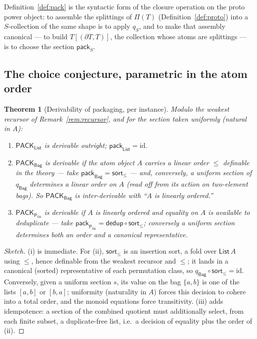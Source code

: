 \documentclass[11pt]{article}
\theoremstyle{definition}
\theoremstyle{plain}
\newtheorem{theorem}[definition]{Theorem}
\newcommand{\p}{\partial}
\newcommand{\T}{T}
\newcommand{\Coll}{S}
\newcommand{\List}{\mathsf{List}}
\newcommand{\Mset}{\mathsf{Bag}}
\newcommand{\Pfin}{\mathsf{P}_{\mathrm{fin}}}
\newcommand{\Pack}{\mathsf{PACK}}
\newcommand{\pack}{\mathsf{pack}}
\newcommand{\Proto}{\Pi}
\newcommand{\id}{\mathrm{id}}
\newcommand{\qmap}{q}
\begin{document}
Definition~\ref{def:pack} is the syntactic form of the closure operation on
the proto power object: to assemble the splittings of $\Proto(\T)$
(Definition~\ref{def:proto}) into a $\Coll$-collection of the same shape is to
apply $\qmap_{\Coll}$, and to make that assembly canonical --- to build
$\T[(\p\T,\T)]$, the collection whose atoms are splittings --- is to choose the
section $\pack_{\Coll}$.

\subsection{The choice conjecture, parametric in the atom order}

\begin{theorem}[Derivability of packaging, per instance]
\label{thm:instances}
Modulo the weakest recursor of Remark~\ref{rem:recursor}, and for the section
taken uniformly (natural in $A$):
\begin{enumerate}[label=\textup{(\roman*)},leftmargin=2.2em]
\item $\Pack_{\List}$ is derivable outright; $\pack_{\List} = \id$.
\item $\Pack_{\Mset}$ is derivable if the atom object $A$ carries a linear
      order $\le$ definable in the theory --- take $\pack_{\Mset} =
      \mathsf{sort}_{\le}$ --- and, conversely, a uniform section of
      $\qmap_{\Mset}$ determines a linear order on $A$ (read off from its
      action on two-element bags). So $\Pack_{\Mset}$ is inter-derivable with
      ``$A$ is linearly ordered.''
\item $\Pack_{\Pfin}$ is derivable if $A$ is linearly ordered \emph{and}
      equality on $A$ is available to deduplicate --- take
      $\pack_{\Pfin} = \mathsf{dedup} \circ \mathsf{sort}_{\le}$; conversely a
      uniform section determines both an order and a canonical
      representative.
\end{enumerate}
\end{theorem}

\begin{proof}[Sketch]
(i) is immediate. For (ii), $\mathsf{sort}_{\le}$ is an insertion sort, a fold
over $\List\,A$ using $\le$, hence definable from the weakest recursor and
$\le$; it lands in a canonical (sorted) representative of each permutation
class, so $\qmap_{\Mset}\circ\mathsf{sort}_{\le} = \id$. Conversely, given a
uniform section $s$, its value on the bag $\{a,b\}$ is one of the lists
$[a,b]$ or $[b,a]$; uniformity (naturality in $A$) forces this decision to
cohere into a total order, and the monoid equations force transitivity.
(iii) adds idempotence: a section of the combined quotient must additionally
select, from each finite subset, a duplicate-free list, i.e.\ a decision of
equality plus the order of (ii). \end{proof}
\end{document}

